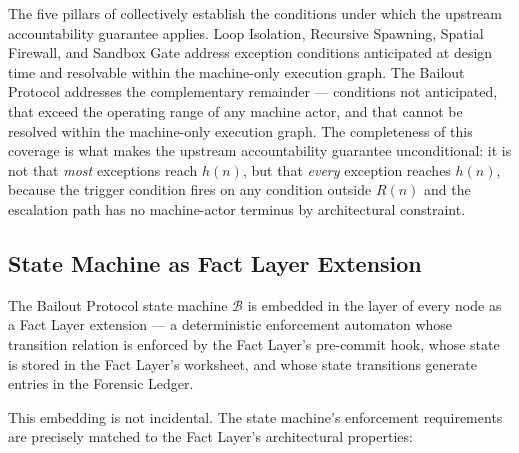 The five pillars of \bxthree{} collectively establish the conditions under which the upstream accountability guarantee applies. Loop Isolation, Recursive Spawning, Spatial Firewall, and Sandbox Gate address exception conditions anticipated at design time and resolvable within the machine-only execution graph. The Bailout Protocol addresses the complementary remainder — conditions not anticipated, that exceed the operating range of any machine actor, and that cannot be resolved within the machine-only execution graph. The completeness of this coverage is what makes the upstream accountability guarantee unconditional: it is not that \emph{most} exceptions reach $h(n)$, but that \emph{every} exception reaches $h(n)$, because the trigger condition fires on any condition outside $R(n)$ and the escalation path has no machine-actor terminus by architectural constraint.

\subsection{State Machine as Fact Layer Extension}\label{sec:state-machine-fact-layer}

The Bailout Protocol state machine $\mathcal{B}$ is embedded in the \fact{} layer of every \bxthree{} node as a Fact Layer extension — a deterministic enforcement automaton whose transition relation is enforced by the Fact Layer's pre-commit hook, whose state is stored in the Fact Layer's worksheet, and whose state transitions generate entries in the Forensic Ledger.

This embedding is not incidental. The state machine's enforcement requirements are precisely matched to the Fact Layer's architectural properties:

